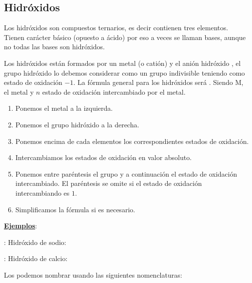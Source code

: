 \documentclass[11pt, a4paper]{article}
\begin{document}
\subsection{Hidróxidos}

Los hidróxidos son compuestos ternarios, es decir contienen tres elementos. Tienen carácter básico (opuesto a ácido) por eso a veces se llaman bases, aunque no todas las bases son hidróxidos.

Los hidróxidos están formados por un metal (o catión) y el anión hidróxido , el grupo hidróxido lo debemos considerar como un grupo indivisible teniendo como estado de oxidación $-1$. La fórmula general para los hidróxidos será . Siendo M, el metal y $n$ estado de oxidación intercambiado por el metal.

\vspace*{2mm}

\begin{enumerate}[label=\itembolascolor{\arabic*}{mygreen}]
    \item Ponemos el metal a la izquierda.
    \item Ponemos el grupo hidróxido  a la derecha.
    \item Ponemos encima de cada elementos los correspondientes estados de oxidación.
    \item Intercambiamos los estados de oxidación en valor absoluto.
    \item Ponemos entre paréntesis el grupo  y a continuación el estado de oxidación intercambiado. El paréntesis se omite si el estado de oxidación intercambiando es $1$.
    \item Simplificamos la fórmula si es necesario.
\end{enumerate}

\textbf{\uline{Ejemplos}}:

: Hidróxido de sodio:   \ch{->} 

: Hidróxido de calcio:   \ch{->} 

\vspace*{2mm}

Los podemos nombrar usando las siguientes nomenclaturas:
\end{document}
